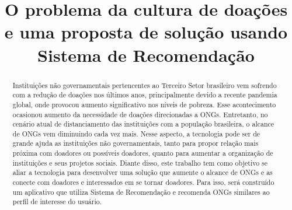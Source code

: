 \documentclass[conference]{IEEEtran}
\begin{document}
\title{O problema da cultura de doações e uma proposta de solução usando Sistema de Recomendação\\
}

\author{
\and
{}
\and
{}
\and
{}
}

\maketitle

\begin{abstract}
Instituições não governamentais pertencentes ao Terceiro Setor brasileiro vem sofrendo com a redução de doações nos últimos anos, principalmente devido a recente pandemia global, onde provocou aumento significativo nos níveis de pobreza. Esse acontecimento ocasionou aumento da necessidade de doações direcionadas a ONGs. Entretanto, no cenário atual de distanciamento das instituições com a população brasileira, o alcance de ONGs vem diminuindo cada vez mais. Nesse aspecto, a tecnologia pode ser de grande ajuda as instituições não governamentais, tanto para propor relação mais próxima com doadores ou possíveis doadores, quanto para aumentar a organização de instituições e seus projetos sociais. Diante disso, este trabalho tem como objetivo se aliar a tecnologia para desenvolver uma solução que aumente o alcance de ONGs e as conecte com doadores e interessados em se tornar doadores. Para isso, será construído um aplicativo que utiliza Sistema de Recomendação e recomenda ONGs similares ao perfil de interesse do usuário.
\end{abstract}
\end{document}
